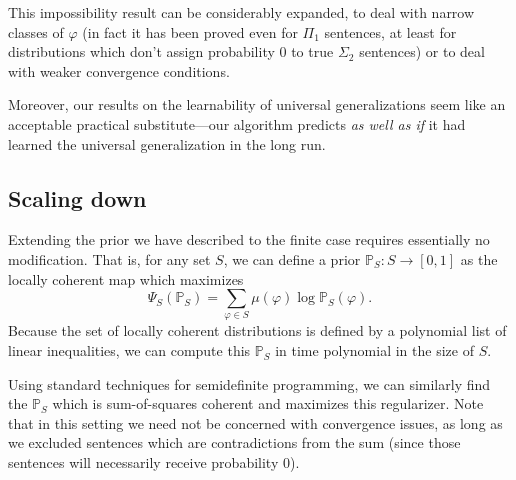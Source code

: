 \documentclass[12pt]{article}
\theoremstyle{definition}
\newcommand{\of}[1]{\left(#1\right)}
\newcommand{\PP}{\mathbb{P}}
\newcommand{\muv}{\mu\of{\vp}}
\newcommand{\vp}{\varphi}
\newcommand{\regs}[1]{\Psi_S\of{#1}}
\begin{document}
This impossibility result can be considerably expanded, to deal with narrow classes
of $\vp$ (in fact it has been proved even for $\Pi_1$ sentences, at least for distributions
which don't assign probability $0$ to true $\Sigma_2$ sentences) %
or to deal with weaker convergence conditions.

Moreover, our results on the learnability of universal generalizations
seem like an acceptable practical substitute---our algorithm
predicts \emph{as well as if} it had learned the universal generalization
in the long run.

\subsection{Scaling down}

Extending the prior we have described to the finite case requires essentially no modification.
That is, for any set $S$, we can define a prior $\PP_S : S \rightarrow [0, 1]$ as the locally coherent
map which maximizes
\[ \regs{\PP_S} = \sum_{\vp \in S} \muv \log{\PP_S\of{\vp}}. \]
Because the set of locally coherent distributions is defined by a polynomial
list of linear inequalities,
we can compute this $\PP_S$ in time polynomial in the size of $S$.

Using standard techniques for semidefinite programming,
we can similarly find the $\PP_S$ which is sum-of-squares coherent
and maximizes this regularizer.
Note that in this setting we need not be concerned with convergence issues,
as long as we excluded sentences which are contradictions from the sum
(since those sentences will necessarily receive probability $0$).
\end{document}

